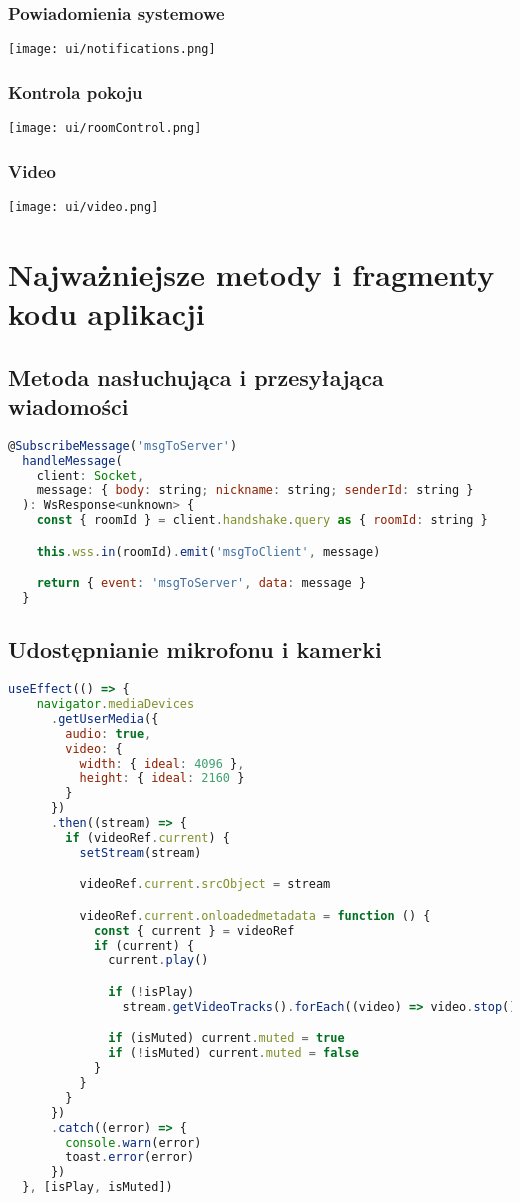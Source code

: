 \documentclass{article}
\begin{document}
\subsubsection{Powiadomienia systemowe}
\texttt{[image: ui/notifications.png]}

\subsubsection{Kontrola pokoju}
\texttt{[image: ui/roomControl.png]}

\subsubsection{Video}
\texttt{[image: ui/video.png]}

\section{Najważniejsze metody i fragmenty kodu aplikacji}

\subsection{Metoda nasłuchująca i przesyłająca wiadomości}
\begin{lstlisting}[language=JavaScript]
  @SubscribeMessage('msgToServer')
  handleMessage(
    client: Socket,
    message: { body: string; nickname: string; senderId: string }
  ): WsResponse<unknown> {
    const { roomId } = client.handshake.query as { roomId: string }

    this.wss.in(roomId).emit('msgToClient', message)

    return { event: 'msgToServer', data: message }
  }
\end{lstlisting}

\subsection{Udostępnianie mikrofonu i kamerki}
\begin{lstlisting}[language=JavaScript]
  useEffect(() => {
    navigator.mediaDevices
      .getUserMedia({
        audio: true,
        video: {
          width: { ideal: 4096 },
          height: { ideal: 2160 }
        }
      })
      .then((stream) => {
        if (videoRef.current) {
          setStream(stream)

          videoRef.current.srcObject = stream

          videoRef.current.onloadedmetadata = function () {
            const { current } = videoRef
            if (current) {
              current.play()

              if (!isPlay)
                stream.getVideoTracks().forEach((video) => video.stop())

              if (isMuted) current.muted = true
              if (!isMuted) current.muted = false
            }
          }
        }
      })
      .catch((error) => {
        console.warn(error)
        toast.error(error)
      })
  }, [isPlay, isMuted])
\end{lstlisting}
\end{document}
